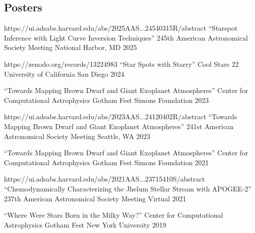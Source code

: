 \subsection*{Posters}

\begin{presentation}
{\cvlink
  {https://ui.adsabs.harvard.edu/abs/2025AAS...24540315R/abstract}
  {``Starspot Inference with Light Curve Inversion Techniques''}}
{245th American Astronomical Society Meeting}
{National Harbor, MD}
{2025}
\end{presentation}

\begin{presentation}
{\cvlink
  {https://zenodo.org/records/13224983}
  {``Star Spots with Starry''}}
{Cool Stars 22}
{University of California San Diego}
{2024}
\end{presentation}

\begin{presentation}
{``Towards Mapping Brown Dwarf and Giant Exoplanet Atmospheres''}
{Center for Computational Astrophysics Gotham Fest}
{Simons Foundation}
{2023}
\end{presentation}

\begin{presentation}
{\cvlink
  {https://ui.adsabs.harvard.edu/abs/2023AAS...24120402R/abstract}
  {``Towards Mapping Brown Dwarf and Giant Exoplanet Atmospheres''}}
{241st American Astronomical Society Meeting}
{Seattle, WA}
{2023}
\end{presentation}

\begin{presentation}
{``Towards Mapping Brown Dwarf and Giant Exoplanet Atmospheres''}
{Center for Computational Astrophysics Gotham Fest}
{Simons Foundation}
{2021}
\end{presentation}

\begin{presentation}
{\cvlink
  {https://ui.adsabs.harvard.edu/abs/2021AAS...23715410S/abstract}
  {``Chemodynamically Characterizing the Jhelum Stellar Stream with APOGEE-2''}}
{237th American Astronomical Society Meeting}
{Virtual}
{2021}
\end{presentation}

\begin{presentation}
{``Where Were Stars Born in the Milky Way?''}
{Center for Computational Astrophysics Gotham Fest}
{New York University}
{2019}
\end{presentation}
